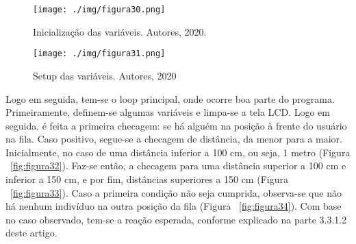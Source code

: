 \documentclass[10pt,twocolumn,letterpaper]{article}
\begin{document}
{
\begin{figure}[!h]
\begin{center}
   \texttt{[image: ./img/figura30.png]}
\end{center}
   \caption{  Inicialização das variáveis. Autores, 2020.  }
\label{fig:figura30}
\end{figure}
} 
{
\begin{figure}[!h]
\begin{center}
   \texttt{[image: ./img/figura31.png]}
\end{center}
   \caption{   Setup das variáveis. Autores, 2020  }
\label{fig:figura31}
\end{figure}
} 

Logo em seguida, tem-se o loop principal, onde ocorre boa parte do programa. Primeiramente, definem-se algumas variáveis e limpa-se a tela LCD. Logo em seguida, é feita a primeira checagem: se há alguém na posição à frente do usuário na fila. Caso positivo, segue-se a checagem de distância, da menor para a maior. Inicialmente, no caso de uma distância inferior a 100 cm, ou seja, 1 metro (Figura ~\ref{fig:figura32}). Faz-se então, a checagem para uma distância superior a 100 cm e inferior a 150 cm, e por fim, distâncias superiores a 150 cm (Figura ~\ref{fig:figura33}). Caso a primeira condição não seja cumprida, observa-se que não há nenhum indivíduo na outra posição da fila (Figura ~\ref{fig:figura34}). Com base no caso observado, tem-se a reação esperada, conforme explicado na parte 3.3.1.2 deste artigo. 
\end{document}
